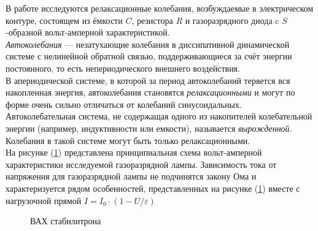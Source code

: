 \documentclass[a4paper,12pt]{article}
\begin{document}
В работе исследуются релаксационные колебания, возбуждаемые в электрическом контуре, состоящем из ёмкости $C$, резистора $R$ и газоразрядного диода c $S$-образной вольт-амперной характеристикой. 
\\
\textit{Автоколебания} — незатухающие колебания в диссипативной динамической системе с 
нелинейной обратной связью, поддерживающиеся за счёт энергии постоянного, то есть непериодического внешнего воздействия. 
\\
В апериодической системе, в которой за период автоколебаний теряется вся накопленная энергия, автоколебания становятся \textit{релаксационными} и могут по форме очень сильно отличаться от колебаний синусоидальных. 
\\
Автоколебательная система, не содержащая одного из накопителей колебательной энергии (например, индуктивности или емкости), называется \textit{вырожденной}. Колебания в такой системе могут быть только релаксационными. 
\\
На рисунке (\ref{fig:plot}) представлена принципиальная схема вольт-амперной характеристики исследуемой газоразрядной лампы. 
Зависимость тока от напряжения для газоразрядной лампы не подчинятся закону Ома и характеризуется рядом особенностей, представленных на рисунке (\ref{fig:plot}) вместе с нагрузочной прямой $I=I_{0}\cdot(1 - U/\varepsilon)$
\begin{figure}[h]
\caption{ВАХ стабилитрона}
\label{fig:plot}
\end{figure}
\end{document}
